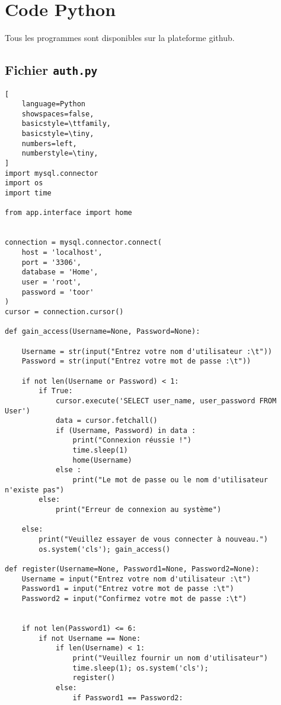 
\chapter{Code Python} \label{annexe1}

Tous les programmes sont disponibles sur la plateforme github.

\section{Fichier \texttt{auth.py}}

\begin{lstlisting}[
    language=Python
    showspaces=false,
    basicstyle=\ttfamily,
    basicstyle=\tiny,
    numbers=left,
    numberstyle=\tiny,
]
import mysql.connector
import os
import time

from app.interface import home


connection = mysql.connector.connect(
    host = 'localhost',
    port = '3306',
    database = 'Home',
    user = 'root',
    password = 'toor'
)
cursor = connection.cursor()

def gain_access(Username=None, Password=None):

    Username = str(input("Entrez votre nom d'utilisateur :\t"))
    Password = str(input("Entrez votre mot de passe :\t"))

    if not len(Username or Password) < 1:
        if True:
            cursor.execute('SELECT user_name, user_password FROM User')
            data = cursor.fetchall()
            if (Username, Password) in data :
                print("Connexion réussie !")
                time.sleep(1)
                home(Username)
            else :
                print("Le mot de passe ou le nom d'utilisateur n'existe pas")
        else:
            print("Erreur de connexion au système")

    else:
        print("Veuillez essayer de vous connecter à nouveau.")
        os.system('cls'); gain_access()

def register(Username=None, Password1=None, Password2=None):
    Username = input("Entrez votre nom d'utilisateur :\t")
    Password1 = input("Entrez votre mot de passe :\t")
    Password2 = input("Confirmez votre mot de passe :\t")


    if not len(Password1) <= 6:
        if not Username == None:
            if len(Username) < 1:
                print("Veuillez fournir un nom d'utilisateur")
                time.sleep(1); os.system('cls');
                register()
            else:
                if Password1 == Password2:


\end{lstlisting}
